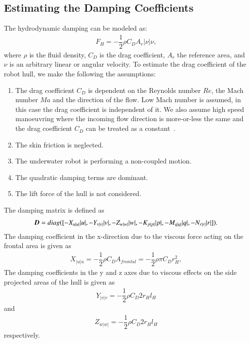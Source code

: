 \subsection{Estimating the Damping Coefficients}
The hydrodynamic damping can be modeled as:
\begin{align}
F_{H}=-\dfrac{1}{2}\rho C_{D}A_{r}|\nu|\nu, 
\end{align}
where $\rho$ is the fluid density, $C_{D}$ is the drag coefficient, $A_{r}$ the reference area, and $\nu$ is an arbitrary linear or angular velocity.
To estimate the drag coefficient of the robot hull, we make the following the assumptions:
\begin{enumerate}
\item The drag coefficient $C_{D}$ is dependent on the Reynolds number $Re$, the Mach number $Ma$ and the direction of the flow. Low Mach number is assumed, in this case the drag coefficient is independent of it. We also assume high speed manoeuvring where the incoming flow direction is more-or-less the same and the drag coefficient $C_{D}$ can be treated as a constant~\cite{wikiDragCoefficient}.
\item The skin friction is neglected.
\item The underwater robot is performing a non-coupled motion.
\item The quadratic damping terms are dominant.
\item The lift force of the hull is not considered.
\end{enumerate}
The damping matrix is defined as
\begin{align}
\emph{\textbf{D}}=
diag([-X_{u|u|}|u|,-Y_{v|v|}|v|,-Z_{w|w|}|w|,-K_{p|p|}|p|,-M_{q|q|}|q|,-N_{r|r|}|r|]).
\end{align}
The damping coefficient in the x-direction due to the viscous force acting on the frontal area is given as 
\begin{align}
X_{|u|u}=-\dfrac{1}{2}\rho C_{D}A_{frontal}=-\dfrac{1}{2}\rho\pi C_{D}r_{H}^{2},
\end{align}
The damping coefficients in the y and z axes due to viscous effects on the side projected areas of the hull is given as
\begin{align}
Y_{|v|v}=-\dfrac{1}{2}\rho C_{D}2r_{H}l_{H}
\end{align}
and 
\begin{align}
Z_{w|w|}=-\dfrac{1}{2}\rho C_{D}2r_{H}l_{H}
\end{align}
respectively.

